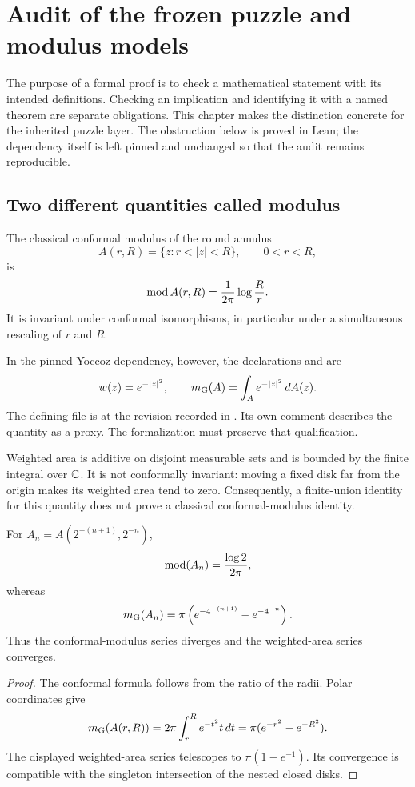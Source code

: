 \chapter{Audit of the frozen puzzle and modulus models}
\label{chap:frozen-audit}

The purpose of a formal proof is to check a mathematical statement with
its intended definitions.  Checking an implication and identifying it
with a named theorem are separate obligations.  This chapter makes the
distinction concrete for the inherited puzzle layer.  The obstruction
below is proved in Lean; the dependency itself is left pinned and
unchanged so that the audit remains reproducible.

\section{Two different quantities called modulus}

The classical conformal modulus of the round annulus
\[
 A(r,R)=\{z:r<|z|<R\},\qquad 0<r<R,
\]
is
\[
 \operatorname{mod} A(r,R)=\frac{1}{2\pi}\log\frac Rr.
\]
It is invariant under conformal isomorphisms, in particular under a
simultaneous rescaling of $r$ and $R$.

In the pinned Yoccoz dependency, however, the declarations
 and  are
\[
 w(z)=e^{-|z|^2},\qquad
 m_{\mathrm G}(A)=\int_A e^{-|z|^2}\,dA(z).
\]
The defining file is
 at the revision recorded
in .  Its own comment describes the quantity
as a proxy.  The formalization must preserve that qualification.

Weighted area is additive on disjoint measurable sets and is bounded by
the finite integral over $\mathbb C$.  It is not conformally invariant: moving
a fixed disk far from the origin makes its weighted area tend to zero.
Consequently, a finite-union identity for this quantity does not prove a
classical conformal-modulus identity.

\begin{proposition}
For $A_n=A(2^{-(n+1)},2^{-n})$,
\[
 \operatorname{mod}(A_n)=\frac{\log2}{2\pi},
\]
whereas
\[
 m_{\mathrm G}(A_n)
 =\pi\left(e^{-4^{-(n+1)}}-e^{-4^{-n}}\right).
\]
Thus the conformal-modulus series diverges and the weighted-area series
converges.
\end{proposition}

\begin{proof}
The conformal formula follows from the ratio of the radii.
Polar coordinates give
\[
 m_{\mathrm G}(A(r,R))
 =2\pi\int_r^R e^{-t^2}t\,dt
 =\pi(e^{-r^2}-e^{-R^2}).
\]
The displayed weighted-area series telescopes to
$\pi(1-e^{-1})$.  Its convergence is compatible with the singleton
intersection of the nested closed disks.
\end{proof}

